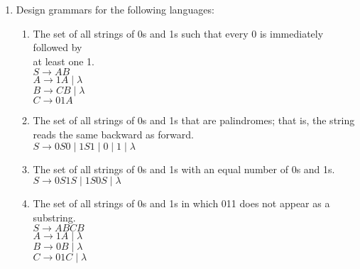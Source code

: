 \documentclass{article}
\begin{document}
\begin{enumerate}
    \item Design grammars for the following languages:
    \begin{enumerate}
        \item The set of all strings of 0s and 1s such that every 0 is immediately followed by \\at least one 1.
        \\ $ S \rightarrow AB $
        \\ $ A \rightarrow 1A \mid \lambda $
        \\ $ B \rightarrow CB \mid \lambda $
        \\ $ C \rightarrow 01A $
        \item The set of all strings of 0s and 1s that are palindromes; that is, the string reads the same backward as forward.
        \\ $ S \rightarrow 0S0 \mid 1S1 \mid 0 \mid 1 \mid \lambda $
        \item The set of all strings of 0s and 1s with an equal number of 0s and 1s.
        \\ $ S \rightarrow 0S1S \mid 1S0S \mid \lambda $
        \item The set of all strings of 0s and 1s in which 011 does not appear as a substring.
        \\ $ S \rightarrow ABCB $
        \\ $ A \rightarrow 1A \mid \lambda $
        \\ $ B \rightarrow 0B \mid \lambda $
        \\ $ C \rightarrow 01C \mid \lambda $
    \end{enumerate}
\end{enumerate}
\end{document}
